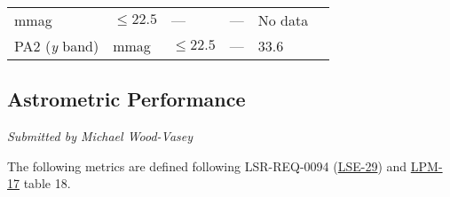 \begin{longtable}[]{@{}llllll@{}}
\begin{minipage}[t]{0.06\columnwidth}
mmag\strut
\end{minipage} & \begin{minipage}[t]{0.17\columnwidth}\raggedright\strut
\(\leq 22.5\)\strut
\end{minipage} & \begin{minipage}[t]{0.17\columnwidth}\raggedright\strut
---\strut
\end{minipage} & \begin{minipage}[t]{0.12\columnwidth}\raggedright\strut
---\strut
\end{minipage} & \begin{minipage}[t]{0.17\columnwidth}\raggedright\strut
No data\strut
\end{minipage}\tabularnewline
\begin{minipage}[t]{0.14\columnwidth}\raggedright\strut
PA2 (\emph{y} band)\strut
\end{minipage} & \begin{minipage}[t]{0.06\columnwidth}\raggedright\strut
mmag\strut
\end{minipage} & \begin{minipage}[t]{0.17\columnwidth}\raggedright\strut
\(\leq 22.5\)\strut
\end{minipage} & \begin{minipage}[t]{0.17\columnwidth}\raggedright\strut
---\strut
\end{minipage} & \begin{minipage}[t]{0.12\columnwidth}\raggedright\strut
33.6\strut
\end{minipage} & \begin{minipage}[t]{0.17\columnwidth}\raggedright\strut
\strut
\end{minipage}\tabularnewline
\bottomrule
\end{longtable}

\subsection{Astrometric Performance}\label{astrometric-performance}

\emph{Submitted by Michael Wood-Vasey}

The following metrics are defined following LSR-REQ-0094
(\href{http://ls.st/lse-29}{LSE-29}) and
\href{http://ls.st/lpm-17}{LPM-17} table 18.


